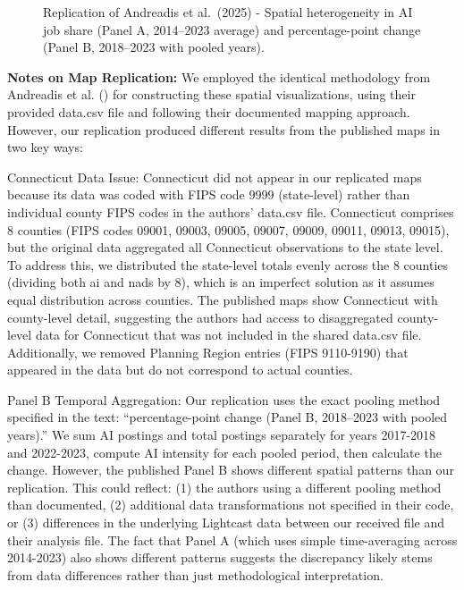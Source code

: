 \documentclass[
]{article}
\makeatletter
\newcommand*\pandocbounded[1]{%
  \sbox\pandoc@box{#1}%
  \Gscale@div\@tempa{\textheight}{\dimexpr\ht\pandoc@box+\dp\pandoc@box\relax}%
  \Gscale@div\@tempb{\linewidth}{\wd\pandoc@box}%
  \ifdim\@tempb\p@<\@tempa\p@\let\@tempa\@tempb\fi%
  \ifdim\@tempa\p@<\p@\scalebox{\@tempa}{\usebox\pandoc@box}%
  \else\usebox{\pandoc@box}%
  \fi%
}
\makeatother
\begin{document}
\begin{figure}[H]

\caption{\label{fig-map}Replication of Andreadis et al.~(2025) - Spatial
heterogeneity in AI job share (Panel A, 2014--2023 average) and
percentage-point change (Panel B, 2018--2023 with pooled years).}

\centering{

\pandocbounded{\texttt{[image: replication\_files/figure-pdf/fig-map-1.pdf]}}

}

\end{figure}%

\textbf{Notes on Map Replication:} We employed the identical methodology
from Andreadis et al. () for
constructing these spatial visualizations, using their provided data.csv
file and following their documented mapping approach. However, our
replication produced different results from the published maps in two
key ways:

Connecticut Data Issue: Connecticut did not appear in our replicated
maps because its data was coded with FIPS code 9999 (state-level) rather
than individual county FIPS codes in the authors' data.csv file.
Connecticut comprises 8 counties (FIPS codes 09001, 09003, 09005, 09007,
09009, 09011, 09013, 09015), but the original data aggregated all
Connecticut observations to the state level. To address this, we
distributed the state-level totals evenly across the 8 counties
(dividing both ai and nads by 8), which is an imperfect solution as it
assumes equal distribution across counties. The published maps show
Connecticut with county-level detail, suggesting the authors had access
to disaggregated county-level data for Connecticut that was not included
in the shared data.csv file. Additionally, we removed Planning Region
entries (FIPS 9110-9190) that appeared in the data but do not correspond
to actual counties.

Panel B Temporal Aggregation: Our replication uses the exact pooling
method specified in the text: ``percentage-point change (Panel B,
2018--2023 with pooled years).'' We sum AI postings and total postings
separately for years 2017-2018 and 2022-2023, compute AI intensity for
each pooled period, then calculate the change. However, the published
Panel B shows different spatial patterns than our replication. This
could reflect: (1) the authors using a different pooling method than
documented, (2) additional data transformations not specified in their
code, or (3) differences in the underlying Lightcast data between our
received file and their analysis file. The fact that Panel A (which uses
simple time-averaging across 2014-2023) also shows different patterns
suggests the discrepancy likely stems from data differences rather than
just methodological interpretation.
\end{document}
